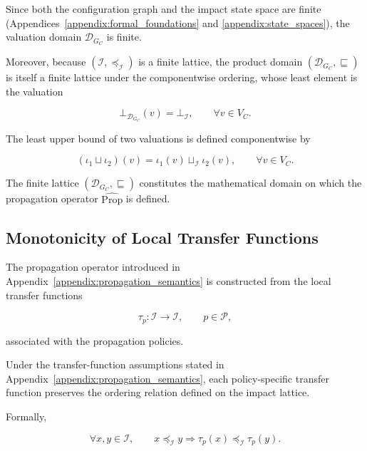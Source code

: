 \documentclass[10pt]{article}
\begin{document}
Since both the configuration graph and the impact state space are finite (Appendices~\ref{appendix:formal_foundations} and
\ref{appendix:state_spaces}), the valuation domain
$\mathcal D_{G_C}$ is finite.

Moreover, because
$\left(\mathcal I,\preceq_{\mathcal I}\right)$
is a finite lattice, the product domain
$\left(\mathcal D_{G_C},\sqsubseteq\right)$
is itself a finite lattice under the componentwise ordering, whose least element is the valuation

\begin{equation}
	\label{eq:bottom_valuation}
	\bot_{\mathcal D_{G_C}}(v)
	=
	\bot_{\mathcal I},
	\qquad
	\forall v\in V_C.
\end{equation}

The least upper bound of two valuations is defined componentwise by

\begin{equation}
	\label{eq:valuation_join}
	(\iota_1
	\sqcup
	\iota_2)(v)
	=
	\iota_1(v)
	\sqcup_{\mathcal I}
	\iota_2(v),
	\qquad
	\forall v\in V_C.
\end{equation}

The finite lattice
$\left(\mathcal D_{G_C},\sqsubseteq\right)$
constitutes the mathematical domain on which the propagation operator
$\widehat{\mathrm{Prop}}$ is defined.

\subsection{Monotonicity of Local Transfer Functions}
\label{appendix:local_monotonicity}
The propagation operator introduced in
Appendix~\ref{appendix:propagation_semantics}
is constructed from the local transfer functions

\[
\tau_p :
\mathcal I
\rightarrow
\mathcal I,
\qquad
p\in\mathcal P,
\]

associated with the propagation policies.

Under the transfer-function assumptions stated in Appendix~\ref{appendix:propagation_semantics}, each policy-specific transfer function preserves the ordering relation defined on the impact lattice.

Formally,

\begin{equation}
	\label{eq:transfer_monotone}
	\forall
	x,y
	\in
	\mathcal I,
	\qquad
	x
	\preceq_{\mathcal I}
	y
	\Longrightarrow
	\tau_p(x)
	\preceq_{\mathcal I}
	\tau_p(y).
\end{equation}
\end{document}
